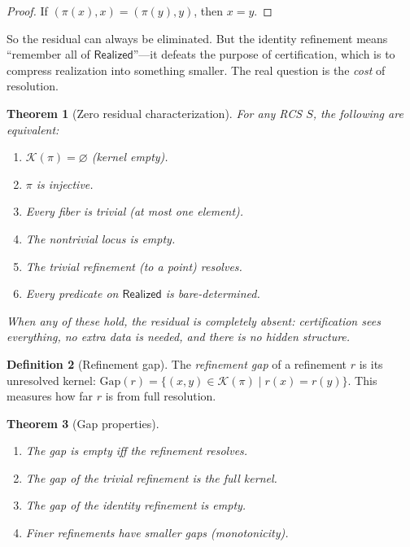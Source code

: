 \documentclass[11pt,a4paper]{article}
\theoremstyle{plain}
\newtheorem{theorem}{Theorem}[section]
\theoremstyle{definition}
\newtheorem{definition}[theorem]{Definition}
\theoremstyle{remark}
\newcommand{\Real}{\mathsf{Realized}}
\newcommand{\compare}{\pi}
\newcommand{\Ker}{\mathcal{K}}
\begin{document}
\begin{proof}
If $(\compare(x), x) = (\compare(y), y)$, then $x = y$.
\end{proof}

So the residual can always be eliminated. But the identity refinement means
``remember all of $\Real$''---it defeats the purpose of certification, which
is to compress realization into something smaller. The real question is the
\emph{cost} of resolution.

\begin{theorem}[Zero residual characterization]\label{thm:zero-res}
For any RCS $S$, the following are equivalent:
\begin{enumerate}[label=(\roman*),nosep]
\item $\Ker(\compare) = \varnothing$ (kernel empty).
\item $\compare$ is injective.
\item Every fiber is trivial (at most one element).
\item The nontrivial locus is empty.
\item The trivial refinement (to a point) resolves.
\item Every predicate on $\Real$ is bare-determined.
\end{enumerate}
When any of these hold, the residual is completely absent: certification sees
everything, no extra data is needed, and there is no hidden structure.
\end{theorem}

\begin{definition}[Refinement gap]\label{def:gap}
The \emph{refinement gap} of a refinement $r$ is its unresolved kernel:
$\mathrm{Gap}(r) = \{(x,y) \in \Ker(\compare) \mid r(x) = r(y)\}$.
This measures how far $r$ is from full resolution.
\end{definition}

\begin{theorem}[Gap properties]\label{thm:gap-props}
\leavevmode
\begin{enumerate}[label=(\roman*),nosep]
\item The gap is empty iff the refinement resolves.
\item The gap of the trivial refinement is the full kernel.
\item The gap of the identity refinement is empty.
\item Finer refinements have smaller gaps (monotonicity).
\end{enumerate}
\end{theorem}
\end{document}
